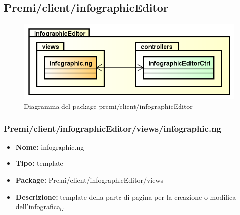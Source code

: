 \clearpage
\subsection{Premi/client/infographicEditor}
\begin{figure}[!h]
\begin{center}
\includegraphics[scale=0.45]{img/diapkg/infographicEditor.png}
\caption{Diagramma del package premi/client/infographicEditor}
\end{center}
\end{figure}
\subsubsection{Premi/client/infographicEditor/views/infographic.ng}
\begin{itemize}
  \item[] \textbf{Nome:} infographic.ng
  \item[] \textbf{Tipo:} template
  \item[] \textbf{Package:} Premi/client/infographicEditor/views
  \item[] \textbf{Descrizione:}  template della parte di pagina per la creazione o modifica dell'infografica$_G$
\end{itemize}

